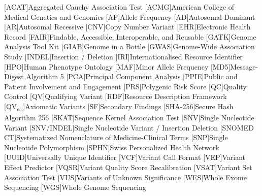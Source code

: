 \documentclass[unnumsec,webpdf,contemporary,large,namedate]{oup-authoring-template}
\begin{document}
\begin{acronym} 
 [ACAT]{Aggregated Cauchy Association Test }
 [ACMG]{American College of Medical Genetics and Genomics}
 [AF]{Allele Frequency}
 [AD]{Autosomal Dominant}
 [AR]{Autosomal Recessive}
  [CNV]{Copy Number Variant}
  [EHR]{Electronic Health Record}
 [FAIR]{Findable, Accessible, Interoperable, and Reusable}
 [GATK]{Genome Analysis Tool Kit}
  [GIAB]{Genome in a Bottle}
 [GWAS]{Genome-Wide Association Study}
 [INDEL]{Insertion / Deletion}
 [IRI]{Internationalised Resource Identifier}
 [HPO]{Human Phenotype Ontology}
 [MAF]{Minor Allele Frequency}
  [MD5]{Message-Digest Algorithm 5}
  [PCA]{Principal Component Analysis} 
 [PPIE]{Public and Patient Involvement and Engagement}
 [PRS]{Polygenic Risk Score} 
 [QC]{Quality Control}
 [QV]{Qualifying Variant}
 [RDF]{Resource Description Framework}
 [QV\textsubscript{ax}]{Axiomatic Variants}
 [SF]{Secondary Findings}
 [SHA-256]{Secure Hash Algorithm 256}
 [SKAT]{Sequence Kernel Association Test} 
 [SNV]{Single Nucleotide Variant}
  [SNV/INDEL]{Single Nucleotide Variant / Insertion Deletion}
  [SNOMED CT]{Systematized Nomenclature of Medicine-Clinical Terms}
 [SNP]{Single Nucleotide Polymorphism}
 [SPHN]{Swiss Personalized Health Network}
 [UUID]{Universally Unique Identifier}
 [VCF]{Variant Call Format}
  [VEP]{Variant Effect Predictor}
 [VQSR]{Variant Quality Score Recalibration}
 [VSAT]{Variant Set Association Test}
 [VUS]{Variants of Unknown Significance}
 [WES]{Whole Exome Sequencing}
 [WGS]{Whole Genome Sequencing}
\end{acronym}



%
%
\end{document}
